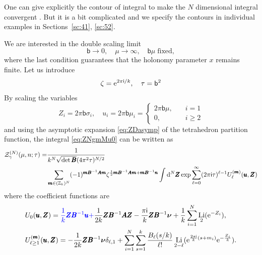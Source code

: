 \documentclass[a4paper,11pt]{article}	%
\DeclareMathOperator{\Li}{Li}
\def\mc{\mathcal}
\def\ms{\mathsf}
\newcommand{\bs}[1]{\boldsymbol{#1}}
\def\IZ{\mathbb{Z}}
\newcommand{\re}{{\rm e}}
\newcommand{\ri}{{\mathsf{i}}}
\newcommand{\rd}{{\rm d}}
\newcommand{\nn}{\nonumber \\}
\newcommand{\bb}{\ms{b}}
\begin{document}
One can give explicitly the contour of integral to make the $N$
dimensional integral convergent \cite{Dimofte:2014zga}.  But it is a
bit complicated and we specify the contours in individual examples in
Sections~\ref{sc:41}, \ref{sc:52}.

We are interested in the double scaling limit
\begin{equation}
  \bb\rightarrow 0,\quad\mu \rightarrow\infty, \quad
  \bb\mu\;\text{fixed},
\end{equation}
where the last condition guarantees that the holonomy parameter $x$
remains finite.
Let us introduce
\begin{equation}
  \zeta = \re^{2\pi\ri/k},\quad \tau = \bb^2
\end{equation}
By scaling the variables
\begin{equation}
  Z_i = 2\pi\bb\sigma_i, \quad u_i = 2\pi\bb\mu_i =
  \begin{cases}
    2\pi\bb\mu,\quad &i=1\\
    0,\quad &i\geq 2
  \end{cases}
\end{equation}
and using the asymptotic expansion \eqref{eq:ZDasymp} of the
tetrahedron partition function, the integral \eqref{eq:ZNgmMu0} can be
written as
\begin{align}
  \mc{Z}_\gamma^{(N)}(\mu,n;\tau) =
  &%
    \frac{1%
    }
    {k^N\sqrt{\det \pmb{B}}(4\pi^2\tau)^{N/2}}\nn
  &\sum_{\pmb{m}\in(\IZ_k)^N}(-1)^{\pmb{m} \pmb{B}^{-1}\pmb{A}\pmb{m}}
    \zeta^{\frac{1}{2}\pmb{m}\pmb{B}^{-1}\pmb{A}\pmb{m}+\pmb{m}\pmb{B}^{-1}\pmb{n}}
    \int\rd^N \pmb{Z} \exp \sum_{\ell=0}^\infty (2\pi\ri\tau)^{\ell-1}
    U^{(\pmb{m})}_\ell(\pmb{u},\pmb{Z})
\end{align}
where the coefficient functions are
\begin{subequations}
  \begin{align}
    &U_0(\pmb{u},\pmb{Z}) = \textcolor{blue}{\frac{1}{k}\pmb{Z}\pmb{B}^{-1}\pmb{u} +}
      \frac{1}{2k}\pmb{Z} \pmb{B}^{-1}\pmb{A}\pmb{Z}
      -\frac{\pi\ri}{k}\pmb{Z}\pmb{B}^{-1}\bs\nu
      +\frac{1}{k}\sum_{i=1}^N\Li_2(\re^{-Z_i})\label{eq:U0},\\
    &U^{(\pmb{m})}_{\ell\geq 1}(\pmb{u},\pmb{Z}) =
      -\frac{1}{2k}\pmb{Z}\pmb{B}^{-1}\bs\nu\delta_{\ell,1} + 
      \sum_{i=1}^N\sum_{s=1}^k
      \frac{B_\ell(s/k)}{\ell!}
      \Li_{2-\ell}(\re^{\frac{2\pi\ri}{k}(s+m_i)}\re^{-\frac{Z_i}{k}}).\label{eq:Ul}
  \end{align}
\end{subequations}
\end{document}
